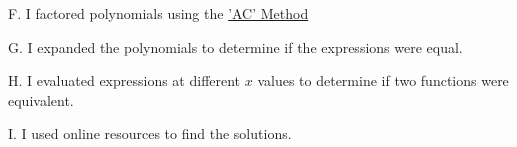 \documentclass{ximera}
\begin{document}
\begin{question}
\begin{question}
    \begin{multipleChoice}
    \end{multipleChoice}
    
\end{question}

\begin{question}    
    
    F. I factored polynomials using the \href{https://people.richland.edu/james/misc/acmeth.html}{'AC' Method}

    \begin{multipleChoice}
    \end{multipleChoice}
    
\end{question}

\begin{question}    
    
    G. I expanded the polynomials to determine if the expressions were equal.

    \begin{multipleChoice}
    \end{multipleChoice}
    
\end{question}

\begin{question}    
    
    H. I evaluated expressions at different $x$ values to determine if two functions were equivalent.

    \begin{multipleChoice}
    \end{multipleChoice}
    
\end{question}
      
\begin{question}    
    
    I. I used online resources to find the solutions.

    \begin{multipleChoice}
    \end{multipleChoice}
    
\end{question}
\begin{question}    
    

\end{question}
\end{question}
\end{document}
